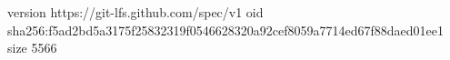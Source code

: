version https://git-lfs.github.com/spec/v1
oid sha256:f5ad2bd5a3175f25832319f0546628320a92cef8059a7714ed67f88daed01ee1
size 5566
